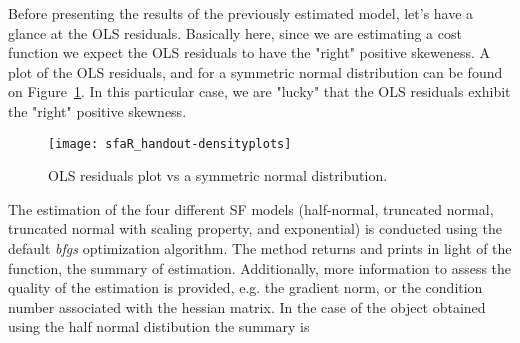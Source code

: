 \documentclass[nojss]{jss}
\begin{document}
Before presenting the results of the previously estimated model, let's have a 
glance at the OLS residuals. Basically here, since we are estimating a cost 
function we expect the OLS residuals to have the "right" positive skeweness. 
A plot of the OLS residuals, and for a symmetric normal distribution can be 
found on Figure~\ref{fig:1}. In this particular case, we are "lucky" that the 
OLS residuals exhibit the "right" positive skewness.

\begin{figure}[t!]
\centering
\texttt{[image: sfaR\_handout-densityplots]}
\caption{\label{fig:1} OLS residuals plot vs a symmetric normal distribution.}
\end{figure}

The estimation of the four different SF models (half-normal, truncated normal, 
truncated normal with scaling property, and exponential) is conducted using the 
default \textit{bfgs} optimization algorithm. The  method returns
and prints in light of the  function, the summary of estimation. 
Additionally, more information to assess the quality of the estimation is 
provided, e.g. the gradient norm, or the condition number associated with the 
hessian matrix. In the case of the object obtained using the half normal 
distibution the summary is
\end{document}
